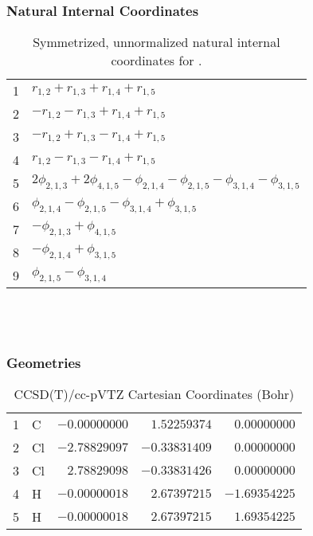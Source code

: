 \documentclass[10pt,oneside]{article}
\begin{document}
\subsubsection*{Natural Internal Coordinates}
\begin{table}[h!]
\centering
\caption{Symmetrized, unnormalized natural internal coordinates for .}
\small
\begin{tabular}{ll}
  1   & $r_{1,2} + r_{1,3} + r_{1,4} + r_{1,5}$ \\
  2   & $-r_{1,2} - r_{1,3} + r_{1,4} + r_{1,5}$ \\
  3   & $-r_{1,2} + r_{1,3} - r_{1,4} + r_{1,5}$ \\
  4   & $r_{1,2} - r_{1,3} - r_{1,4} + r_{1,5}$ \\
  5   & $2\phi_{2,1,3} + 2\phi_{4,1,5} - \phi_{2,1,4} - \phi_{2,1,5} - \phi_{3,1,4} - \phi_{3,1,5}$ \\
  6   & $\phi_{2,1,4} - \phi_{2,1,5} - \phi_{3,1,4} + \phi_{3,1,5}$ \\
  7   & $-\phi_{2,1,3} + \phi_{4,1,5}$ \\
  8   & $-\phi_{2,1,4} + \phi_{3,1,5}$ \\
  9   & $\phi_{2,1,5} - \phi_{3,1,4}$ \\
\end{tabular}
\end{table}

\clearpage

\subsection{\ \ \ }

\subsubsection*{Geometries}
\begin{table}[h!]
\centering
\caption{CCSD(T)/cc-pVTZ Cartesian Coordinates (Bohr)}
\begin{tabular}{llrrr}
1  & C  & $-0.00000000$ & $ 1.52259374$ & $ 0.00000000$ \\
2  & Cl & $-2.78829097$ & $-0.33831409$ & $ 0.00000000$ \\
3  & Cl & $ 2.78829098$ & $-0.33831426$ & $ 0.00000000$ \\
4  & H  & $-0.00000018$ & $ 2.67397215$ & $-1.69354225$ \\
5  & H  & $-0.00000018$ & $ 2.67397215$ & $ 1.69354225$ \\
\end{tabular}
\end{table}
\end{document}
